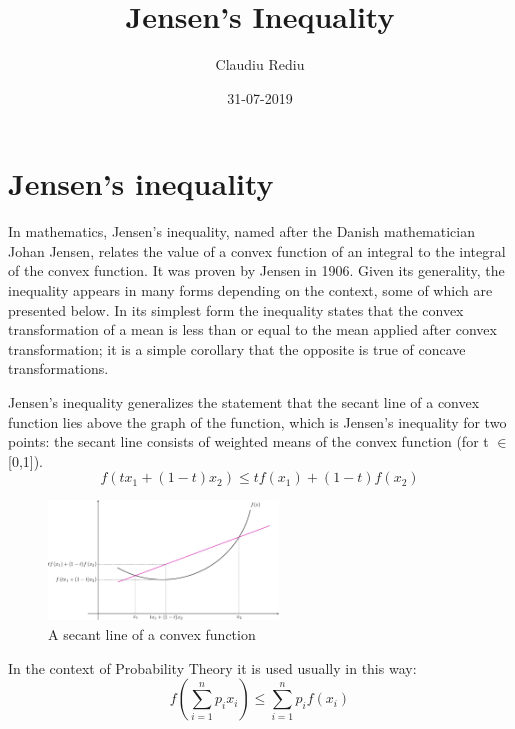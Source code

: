 \documentclass[11pt, a4paper, twocolumn]{article}
\title{{\myfont Jensen's Inequality}}
\date{31-07-2019}
\author{Claudiu Rediu}
\theoremstyle{definition}
\begin{document}
	\maketitle
	\newpage
	\newpage
	
	\section*{Jensen's inequality}
		
	In mathematics, Jensen's inequality, named after the Danish mathematician Johan Jensen, relates the value of a convex function of an integral to the integral of the convex function. It was proven by Jensen in 1906. Given its generality, the inequality appears in many forms depending on the context, some of which are presented below. In its simplest form the inequality states that the convex transformation of a mean is less than or equal to the mean applied after convex transformation; it is a simple corollary that the opposite is true of concave transformations.
	
	Jensen's inequality generalizes the statement that the secant line of a convex function lies above the graph of the function, which is Jensen's inequality for two points: the secant line consists of weighted means of the convex function (for t $\in$ [0,1]).
	\begin{equation}
		f(tx_1 + (1-t)x_2) \leq tf(x_1) + (1-t)f(x_2)
	\end{equation}
	
	\begin{figure}[H]
	\includegraphics[width=\linewidth, height=120px]{ConvexFunction.pdf}
	\caption{A secant line of a convex function}
	\end{figure}

	In the context of Probability Theory it is used usually in this way:
	\begin{equation}
	f(\sum_{i=1}^{n}p_ix_i) \leq \sum_{i=1}^{n}p_if(x_i)
	\end{equation}
	
\end{document}

